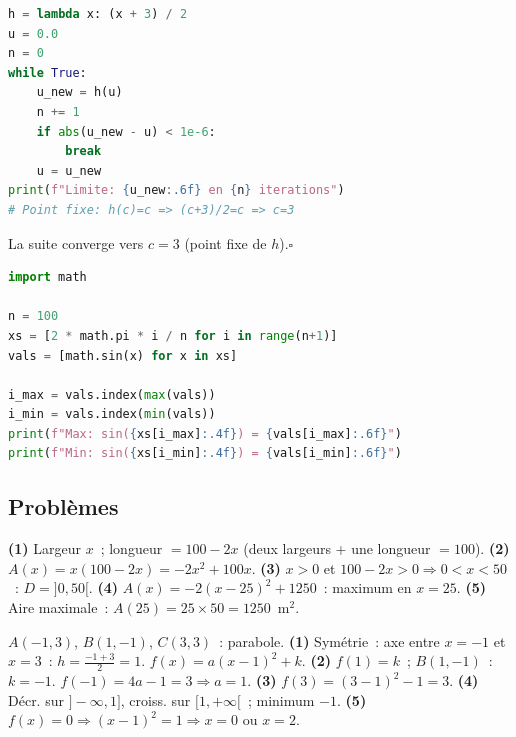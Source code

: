 \begin{lstlisting}[language=Python]
h = lambda x: (x + 3) / 2
u = 0.0
n = 0
while True:
    u_new = h(u)
    n += 1
    if abs(u_new - u) < 1e-6:
        break
    u = u_new
print(f"Limite: {u_new:.6f} en {n} iterations")
# Point fixe: h(c)=c => (c+3)/2=c => c=3
\end{lstlisting}
La suite converge vers $c=3$ (point fixe de $h$).\hfill$\square$


\begin{lstlisting}[language=Python]
import math

n = 100
xs = [2 * math.pi * i / n for i in range(n+1)]
vals = [math.sin(x) for x in xs]

i_max = vals.index(max(vals))
i_min = vals.index(min(vals))
print(f"Max: sin({xs[i_max]:.4f}) = {vals[i_max]:.6f}")
print(f"Min: sin({xs[i_min]:.4f}) = {vals[i_min]:.6f}")
\end{lstlisting}

\subsection*{Probl\`emes}


\textbf{(1)} Largeur $x$~; longueur $=100-2x$ (deux largeurs + une longueur $=100$).
\textbf{(2)} $A(x)=x(100-2x)=-2x^2+100x$.
\textbf{(3)} $x>0$ et $100-2x>0\Rightarrow0<x<50$~: $D=]0,50[$.
\textbf{(4)} $A(x)=-2(x-25)^2+1250$~: maximum en $x=25$.
\textbf{(5)} Aire maximale~: $A(25)=25\times50=1250$~m$^2$.


$A(-1,3)$, $B(1,-1)$, $C(3,3)$~: parabole.
\textbf{(1)} Sym\'etrie~: axe entre $x=-1$ et $x=3$~: $h=\frac{-1+3}{2}=1$. $f(x)=a(x-1)^2+k$.
\textbf{(2)} $f(1)=k$~; $B(1,-1)$~: $k=-1$. $f(-1)=4a-1=3\Rightarrow a=1$.
\textbf{(3)} $f(3)=(3-1)^2-1=3$.\checkmark
\textbf{(4)} D\'ecr. sur $]-\infty,1]$, croiss. sur $[1,+\infty[$~; minimum $-1$.
\textbf{(5)} $f(x)=0\Rightarrow(x-1)^2=1\Rightarrow x=0$ ou $x=2$.

